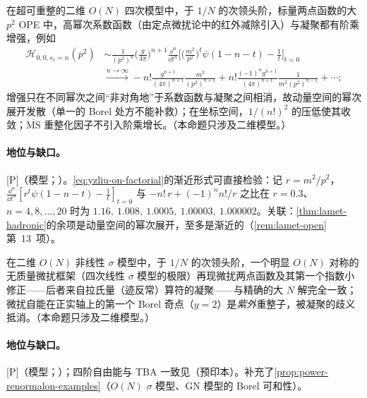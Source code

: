 \begin{proposition}\label{prop:yzliu-on-factorial}
在超可重整的二维 $O(N)$ 四次模型中，于 $1/N$ 的次领头阶，标量两点函数的大 $p^2$ OPE 中，高幂次系数函数（由定点微扰论中的红外减除引入）与凝聚都有阶乘增强，例如 %
\begin{equation}\label{eq:yzliu-on-factorial}
\begin{aligned}
\mathcal H_{0,0,s_1=n}(p^2)&\sim\frac1{(p^2)^n}\Big(\frac g{4\pi}\Big)^{n+1}\frac{\dd^n}{\dd t^n}\Big[\Big(\frac{m^2}{p^2}\Big)^t\psi(1-n-t)-\frac1t\Big]_{t=0}\\
&\xrightarrow{n\to\infty}-n!\frac{g^{n+1}}{(4\pi)^{n+1}}\frac{m^2}{(p^2)^{n+1}}+n!\frac{(-1)^ng^{n+1}}{(4\pi)^{n+1}}\frac1{m^2(p^2)^{n-1}}+\cdots ;
\end{aligned}
\end{equation}
增强只在不同幂次之间“非对角地”于系数函数与凝聚之间相消，故动量空间的幂次展开发散（单一的 Borel 处方不能补救）；在坐标空间，$1/(n!)^2$ 的压低使其收敛；$\overline{\mathrm{MS}}$ 重整化因子不引入阶乘增长。（本命题只涉及二维模型。）
\end{proposition}

\paragraph{地位与缺口。}[P]（模型；\cite[第~1、4~节]{Liu:2025edu}）。\cref{eq:yzliu-on-factorial}的渐近形式可直接检验：记 $r=m^2/p^2$，$\frac{\dd^n}{\dd t^n}[r^t\psi(1-n-t)-\frac1t]_{t=0}$ 与 $-n!\,r+(-1)^nn!/r$ 之比在 $r=0.3$、$n=4,8,\dots,20$ 时为 $1.16,\ 1.008,\ 1.0005,\ 1.00003,\ 1.000002$。关联：\cref{thm:lamet-hadronic}的余项是动量空间的幂次展开，至多是渐近的（\cref{rem:lamet-open}第~13~项）。

\begin{proposition}\label{prop:yzliu-nlsm}
在二维 $O(N)$ 非线性 $\sigma$ 模型中，于 $1/N$ 的次领头阶，一个明显 $O(N)$ 对称的无质量微扰框架（四次线性 $\sigma$ 模型的极限）再现微扰两点函数及其第一个指数小修正——后者来自拉氏量（迹反常）算符的凝聚——与精确的大 $N$ 解完全一致；微扰自能在正实轴上的第一个 Borel 奇点（$y=2$）是\emph{紫外}重整子，被凝聚的歧义抵消。（本命题只涉及二维模型。）
\end{proposition}

\paragraph{地位与缺口。}[P]（模型；\cite[第~1、5~节]{Liu:2025bqq}）；四阶自由能与 TBA 一致见\cite{Liu:2026npv}（预印本）。补充了\cref{prop:power-renormalon-examples}（$O(N)$ $\sigma$ 模型、GN 模型的 Borel 可和性）。

